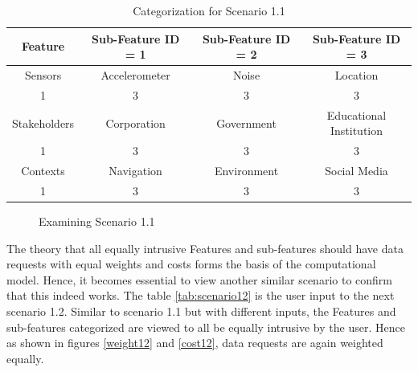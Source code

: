 \begin{table}[h!]
  \centering
  \caption{Categorization for Scenario 1.1}
  \label{tab:scenario11}
  \begin{tabular}{cccc}
    \toprule
    Feature & Sub-Feature ID = 1 & Sub-Feature ID = 2 & Sub-Feature ID = 3\\
    \midrule
    Sensors & Accelerometer & Noise & Location\\
     1 & 3 & 3 & 3\\ \hhline{====}
     Stakeholders & Corporation & Government & Educational Institution\\
     1 & 3 & 3 & 3\\ \hhline{====}
     Contexts & Navigation & Environment & Social Media\\
     1 & 3 & 3 & 3\\ 
    \bottomrule
  \end{tabular}
\end{table}
 
\begin{figure}[htp]
  \caption{Examining Scenario 1.1}
  \label{fig:scenatio11}
\end{figure}

The theory that all equally intrusive Features and sub-features should have data requests with equal weights and costs forms the basis of the computational model. Hence, it becomes essential to view another similar scenario to confirm that this indeed works. The table \ref{tab:scenario12} is the user input to the next scenario 1.2. Similar to scenario 1.1 but with different inputs, the Features and sub-features categorized
are viewed to all be equally intrusive by the user. Hence as shown in figures \ref{weight12} and \ref{cost12}, data requests are again weighted equally.

